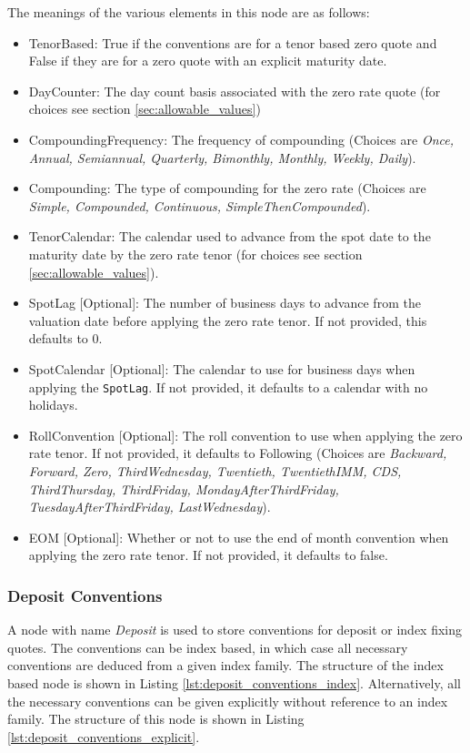 The meanings of the various elements in this node are as follows:
\begin{itemize}
\item TenorBased: True if the conventions are for a tenor based zero quote and False if they are
for a zero quote with an explicit maturity date.
\item DayCounter: The day count basis associated with the zero rate quote (for choices see section
\ref{sec:allowable_values})
\item CompoundingFrequency: The frequency of compounding (Choices are {\em Once, Annual, Semiannual, Quarterly,
Bimonthly, Monthly, Weekly, Daily}).
\item Compounding: The type of compounding for the zero rate (Choices are {\em Simple, Compounded, Continuous,
SimpleThenCompounded}).
\item TenorCalendar: The calendar used to advance from the spot date to the maturity date by the zero rate tenor (for
choices see section \ref{sec:allowable_values}).
\item SpotLag [Optional]: The number of business days to advance from the valuation date before applying the zero rate
tenor. If not provided, this defaults to 0.
\item SpotCalendar [Optional]: The calendar to use for business days when applying the \lstinline!SpotLag!. If not
provided, it defaults to a calendar with no holidays.
\item RollConvention [Optional]: The roll convention to use when applying the zero rate tenor. If not provided, it
defaults to Following (Choices are {\em Backward, Forward, Zero, ThirdWednesday, Twentieth, TwentiethIMM, CDS, ThirdThursday, ThirdFriday, MondayAfterThirdFriday, TuesdayAfterThirdFriday, LastWednesday}).
\item EOM [Optional]: Whether or not to use the end of month convention when applying the zero rate tenor. If not
provided, it defaults to false.
\end{itemize}

\subsubsection{Deposit Conventions}

A node with name \emph{Deposit} is used to store conventions for deposit or index fixing quotes. The conventions can be
index based, in which case all necessary conventions are deduced from a given index family. The structure of the index
based node is shown in Listing \ref{lst:deposit_conventions_index}. Alternatively, all the necessary conventions can be
given explicitly without reference to an index family. The structure of this node is shown in Listing
\ref{lst:deposit_conventions_explicit}.

